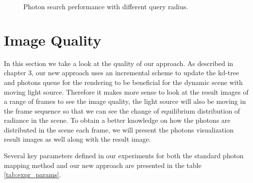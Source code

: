\begin{figure}[ftp] 
    \centering 
    \renewcommand{\thefigure}{\thechapter.\arabic{figure}}
    \caption[Photon search performance with different query radius]{Photon search performance with different query radius. }
    \label{fig:photon_search_2}  
\end{figure} 

\section{Image Quality}

In this section we take a look at the quality of our approach. As described in chapter 3, our new approach uses an incremental scheme to update the kd-tree and photons queue for the rendering to be beneficial for the dynamic scene with moving light source. Therefore it makes more sense to look at the result images of a range of frames to see the image quality, the light source will also be moving in the frame sequence so that we can see the change of equilibrium distribution of radiance in the scene. To obtain a better knowledge on how the photons are distributed in the scene each frame, we will present the photons visualization result images as well along with the result image. 

Several key parameters defined in our experiments for both the standard photon mapping method and our new approach are presented in the table \ref{tab:expr_params}. 

